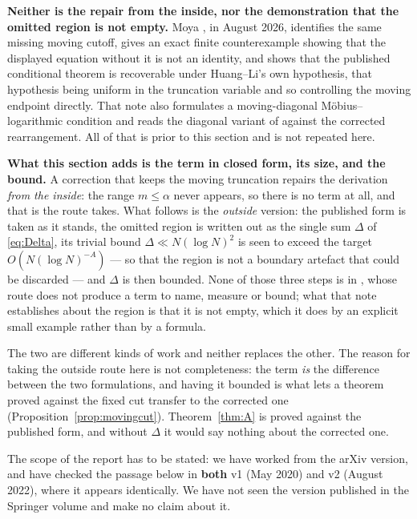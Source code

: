 \documentclass[11pt,a4paper]{article}
\theoremstyle{plain}
\theoremstyle{definition}
\theoremstyle{remark}
\begin{document}
\textbf{Neither is the repair from the inside, nor the demonstration
that the omitted region is not empty.} Moya \cite{Moya}, in August
2026, identifies the same missing moving cutoff, gives an exact finite
counterexample showing that the displayed equation without it is not an
identity, and shows that the published conditional theorem is
recoverable under Huang--Li's own hypothesis, that hypothesis being
uniform in the truncation variable and so controlling the moving
endpoint directly. That note also formulates a moving-diagonal
M\"obius--logarithmic condition and reads the diagonal variant of
\cite{Can} against the corrected rearrangement. All of that is prior to
this section and is not repeated here.

\textbf{What this section adds is the term in closed form, its size,
and the bound.} A correction that keeps the moving truncation repairs
the derivation \emph{from the inside}: the range $m\le\alpha$ never
appears, so there is no term at all, and that is the route \cite{Moya}
takes. What follows is the \emph{outside} version: the published form
is taken as it stands, the omitted region is written out as the single
sum $\Delta$ of \eqref{eq:Delta}, its trivial bound
$\Delta\ll N(\log N)^{2}$ is seen to exceed the target
$O(N(\log N)^{-A})$ --- so that the region is not a boundary artefact
that could be discarded --- and $\Delta$ is then bounded. None of those
three steps is in \cite{Moya}, whose route does not produce a term to
name, measure or bound; what that note establishes about the region is
that it is not empty, which it does by an explicit small example rather
than by a formula.

The two are different kinds of work and neither replaces the other.
The reason for taking the outside route here is not completeness: the
term \emph{is} the difference between the two formulations, and having
it bounded is what lets a theorem proved against the fixed cut transfer
to the corrected one (Proposition~\ref{prop:movingcut}).
Theorem~\ref{thm:A} is proved against the published form, and without
$\Delta$ it would say nothing about the corrected one.

The scope of the report has to be stated: we have worked from the arXiv
version, and have checked the passage below in \textbf{both} v1 (May
2020) and v2 (August 2022), where it appears identically. We have not
seen the version published in the Springer volume and make no claim
about it.
\end{document}
